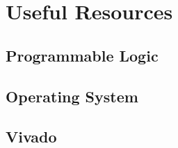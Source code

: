 \chapter{Useful Resources}

\section{Programmable Logic}

\section{Operating System}

\section{Vivado}
